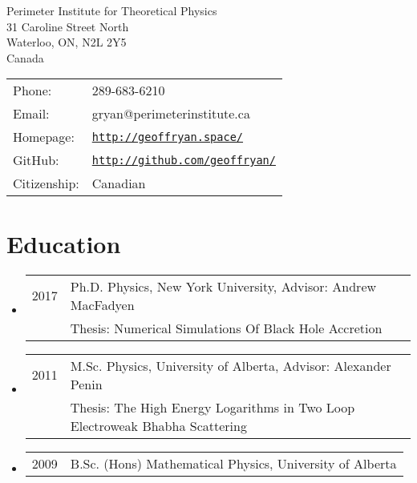 {\huge \name}


\vspace{0.25in}

\begin{minipage}{0.45\linewidth}
  Perimeter Institute for Theoretical Physics \\
  31 Caroline Street North\\
  Waterloo, ON, N2L 2Y5\\
  Canada
\end{minipage}
\begin{minipage}{0.45\linewidth}
  \begin{tabular}{ll}
    Phone: & 289-683-6210 \\
    Email: &  gryan@perimeterinstitute.ca \\
    Homepage: & \href{http://geoffryan.space/}{\tt http://geoffryan.space/} \\
    GitHub: & \href{http://github.com/geoffryan/}{\tt http://github.com/geoffryan/} \\
    Citizenship: &Canadian
  \end{tabular}
\end{minipage}

\section*{Education}
\begin{itemize}
\item \begin{tabular}{ll}
2017 & Ph.D. Physics, New York University, Advisor: Andrew MacFadyen \\
	& Thesis: Numerical Simulations Of Black Hole Accretion
\end{tabular}

\item \begin{tabular}{ll}
2011 &  M.Sc. Physics, University of Alberta, Advisor: Alexander Penin \\
	& Thesis: The High Energy Logarithms in Two Loop Electroweak Bhabha Scattering
\end{tabular}

\item \begin{tabular}{ll}
2009 &  B.Sc. (Hons) Mathematical Physics, University of Alberta \\
\end{tabular}
\end{itemize}

